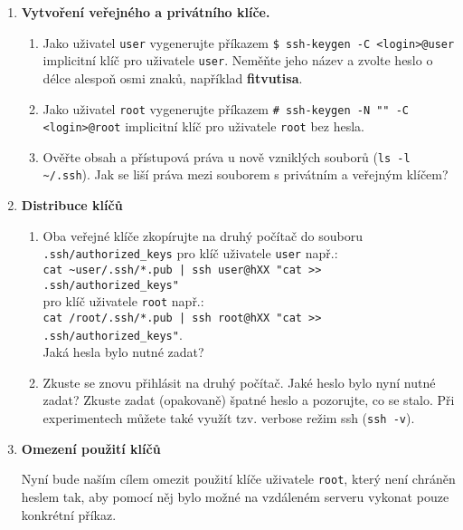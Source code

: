 \documentclass[a4paper,11pt]{article}
\begin{document}
\begin{enumerate}
  \item {\bf Vytvoření veřejného a privátního klíče.}

    \begin{enumerate}

      \item Jako uživatel {\tt user} vygenerujte příkazem \verb|$ ssh-keygen -C <login>@user| implicitní klíč pro uživatele {\tt user}.
        Neměňte jeho název a zvolte heslo o délce alespoň osmi znaků, například \textbf{fitvutisa}.

      \item Jako uživatel {\tt root} vygenerujte příkazem \verb|# ssh-keygen -N "" -C <login>@root| implicitní klíč pro uživatele {\tt root} bez hesla.

      \item Ověřte obsah a přístupová práva u nově vzniklých souborů (\verb|ls -l ~/.ssh|).
        Jak se liší práva mezi souborem s privátním a veřejným klíčem?

    \end{enumerate}

  \item {\bf Distribuce klíčů}

    \begin{enumerate}

      \item Oba veřejné klíče zkopírujte na druhý počítač do souboru \verb|.ssh/authorized_keys| pro klíč uživatele {\tt user} např.: \\
        {\verb&cat ~user/.ssh/*.pub | ssh user@hXX "cat >> .ssh/authorized_keys"&} \\
        pro klíč uživatele {\tt root} např.: \\
        {\verb&cat /root/.ssh/*.pub | ssh root@hXX "cat >> .ssh/authorized_keys"&}. \\

      Jaká hesla bylo nutné zadat?

      \item Zkuste se znovu přihlásit na druhý počítač.
        Jaké heslo bylo nyní nutné zadat?
        Zkuste zadat (opakovaně) špatné heslo a pozorujte, co se stalo.
        Při experimentech můžete také využít tzv. verbose režim ssh ({\tt ssh -v}).

    \end{enumerate}

  \item {\bf Omezení použití klíčů}

    Nyní bude naším cílem omezit použití klíče uživatele {\tt root}, který není chráněn heslem tak, aby pomocí něj bylo možné na vzdáleném serveru vykonat pouze konkrétní příkaz.


\end{enumerate}
\end{document}
